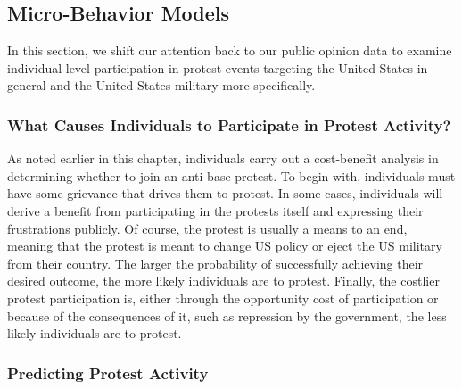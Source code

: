 
\subsection*{Micro-Behavior Models}


In this section, we shift our attention back to our public opinion data to examine individual-level participation in protest events targeting the United States in general and the United States military more specifically. 


\subsubsection*{What Causes Individuals to Participate in Protest Activity?}

As noted earlier in this chapter, individuals carry out a cost-benefit analysis in determining whether to join an anti-base protest. To begin with, individuals must have some grievance that drives them to protest. In some cases, individuals will derive a benefit from participating in the protests itself and expressing their frustrations publicly. Of course, the protest is usually a means to an end, meaning that the protest is meant to change US policy or eject the US military from their country. The larger the probability of successfully achieving their desired outcome, the more likely individuals are to protest. Finally, the costlier protest participation is, either through the opportunity cost of participation or because of the consequences of it, such as repression by the government, the less likely individuals are to protest. 



\subsubsection*{Predicting Protest Activity}


